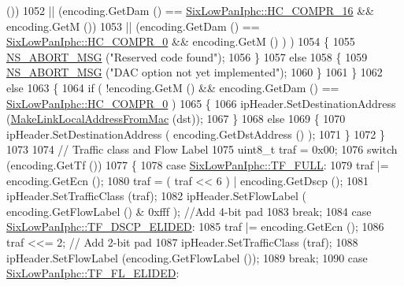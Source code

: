 \begin{DoxyCode}
      ())
1052           || (encoding.GetDam () == \hyperlink{classns3_1_1SixLowPanIphc_a384e6b68c86e9d9a07c923dbc21a6843a492caa9d3c810686e9e3f1c35ef39fd9}{SixLowPanIphc::HC\_COMPR\_16}  && encoding.GetM 
      ())
1053           || (encoding.GetDam () == \hyperlink{classns3_1_1SixLowPanIphc_a384e6b68c86e9d9a07c923dbc21a6843a20c6daaf8cc1cfec17270484cec677c0}{SixLowPanIphc::HC\_COMPR\_0}  && encoding.GetM ()
      ) )
1054         \{
1055           \hyperlink{group__fatal_ga51ac4699be799d772ae7258d1ef6af21}{NS\_ABORT\_MSG} (\textcolor{stringliteral}{"Reserved code found"});
1056         \}
1057       \textcolor{keywordflow}{else}
1058         \{
1059           \hyperlink{group__fatal_ga51ac4699be799d772ae7258d1ef6af21}{NS\_ABORT\_MSG} (\textcolor{stringliteral}{"DAC option not yet implemented"});
1060         \}
1061     \}
1062   \textcolor{keywordflow}{else}
1063     \{
1064       \textcolor{keywordflow}{if} ( !encoding.GetM () && encoding.GetDam () == \hyperlink{classns3_1_1SixLowPanIphc_a384e6b68c86e9d9a07c923dbc21a6843a20c6daaf8cc1cfec17270484cec677c0}{SixLowPanIphc::HC\_COMPR\_0} )
1065         \{
1066           ipHeader.SetDestinationAddress (\hyperlink{classns3_1_1SixLowPanNetDevice_acf66b0ff019d0f1b88212d452044696e}{MakeLinkLocalAddressFromMac} (dst));
1067         \}
1068       \textcolor{keywordflow}{else}
1069         \{
1070           ipHeader.SetDestinationAddress ( encoding.GetDstAddress () );
1071         \}
1072     \}
1073 
1074   \textcolor{comment}{// Traffic class and Flow Label}
1075   uint8\_t traf = 0x00;
1076   \textcolor{keywordflow}{switch} (encoding.GetTf ())
1077     \{
1078     \textcolor{keywordflow}{case} \hyperlink{classns3_1_1SixLowPanIphc_ac4bbe4168668e3b0656582cfa757b7dcab374d0f6554d306b0ee29fd9ff83a5ef}{SixLowPanIphc::TF\_FULL}:
1079       traf |= encoding.GetEcn ();
1080       traf = ( traf << 6 ) | encoding.GetDscp ();
1081       ipHeader.SetTrafficClass (traf);
1082       ipHeader.SetFlowLabel ( encoding.GetFlowLabel () & 0xfff ); \textcolor{comment}{//Add 4-bit pad}
1083       \textcolor{keywordflow}{break};
1084     \textcolor{keywordflow}{case} \hyperlink{classns3_1_1SixLowPanIphc_ac4bbe4168668e3b0656582cfa757b7dcaf64261a5e5ef77a117b16328645ce6b8}{SixLowPanIphc::TF\_DSCP\_ELIDED}:
1085       traf |= encoding.GetEcn ();
1086       traf <<= 2;   \textcolor{comment}{// Add 2-bit pad}
1087       ipHeader.SetTrafficClass (traf);
1088       ipHeader.SetFlowLabel (encoding.GetFlowLabel ());
1089       \textcolor{keywordflow}{break};
1090     \textcolor{keywordflow}{case} \hyperlink{classns3_1_1SixLowPanIphc_ac4bbe4168668e3b0656582cfa757b7dca616bab00b36d2ac76b009acbeb1105fa}{SixLowPanIphc::TF\_FL\_ELIDED}:

\end{DoxyCode}
